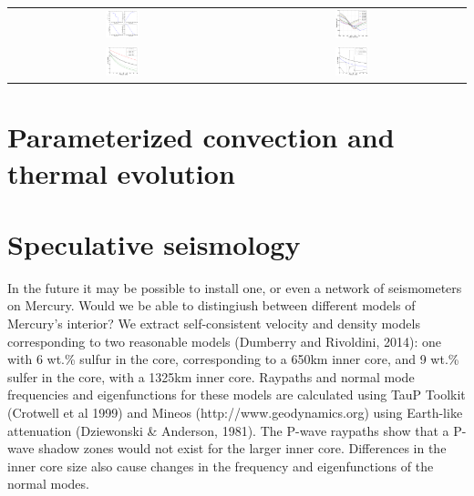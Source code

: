 \documentclass[landscape,a0b,final]{a0poster}
\begin{document}
\begin{multicols}{3}
\begin{center}
\begin{tabular}{cc}
 \includegraphics[width=0.15\textwidth]{profiles.png} &
 \includegraphics[width=0.15\textwidth]{Liquidus_model.png} \\
 \includegraphics[width=0.15\textwidth]{clapeyron_1.png} &
 \includegraphics[width=0.15\textwidth]{clapeyron_2.png} \\
\end{tabular}
\label{interior_model}
\end{center}

\columnbreak

\section*{Parameterized convection and thermal evolution}



\section*{Speculative seismology}

In the future it may be possible to install one, or even a network of seismometers on Mercury. Would we be able to distingiush between different models of Mercury's interior? We extract self-consistent velocity and density models corresponding to two reasonable models (Dumberry and Rivoldini, 2014): one with 6 wt.\% sulfur in the core, corresponding to a 650km inner core, and 9 wt.\% sulfer in the core, with a 1325km inner core.
Raypaths and normal mode frequencies and eigenfunctions for these models are calculated using TauP Toolkit (Crotwell et al 1999) and Mineos (http://www.geodynamics.org) using Earth-like attenuation (Dziewonski \&  Anderson, 1981). The P-wave raypaths show that a P-wave shadow zones would not exist for the larger inner core. Differences in the inner core size also cause changes in the frequency and eigenfunctions of the normal modes. 


\end{multicols}
\end{document}
